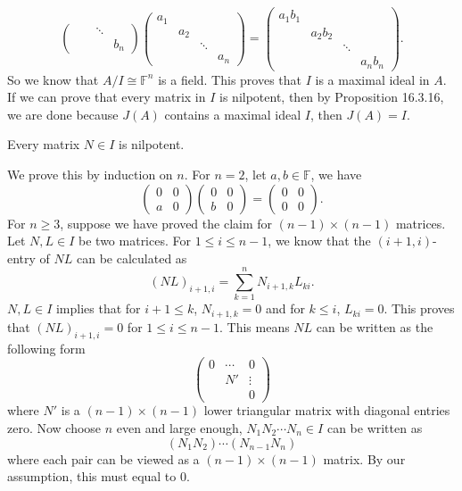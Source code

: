 \documentclass[a4paper, 12pt]{article}
\begin{document}
\begin{solution}
\[\begin{pmatrix}
    & & \ddots &  \\ 
    & & & b_n
\end{pmatrix}\begin{pmatrix}
    a_1& & &  \\ 
    &a_2& &  \\ 
    & & \ddots &  \\ 
    & & & a_n
\end{pmatrix}=\begin{pmatrix}
    a_1b_1& & &  \\ 
    &a_2b_2& &  \\ 
    & & \ddots &  \\ 
    & & & a_nb_n
\end{pmatrix}.\]
So we know that \(A/I\cong \mathbb{F}^n\) is a field. This proves that \(I\) is a maximal ideal in \(A\). If we can prove that every matrix in \(I\) is nilpotent, then by Proposition 16.3.16, we are done because \(J(A)\) contains a maximal ideal \(I\), then \(J(A)=I\). 
\begin{claim}
Every matrix \(N\in I\) is nilpotent. 
\end{claim}
\begin{claimproof}
We prove this by induction on \(n\). For \(n=2\), let \(a,b\in \mathbb{F}\), we have 
\[\begin{pmatrix}
    0&0\\ 
    a&0
\end{pmatrix}\begin{pmatrix}
    0&0\\ 
    b&0
\end{pmatrix}=\begin{pmatrix}
    0&0\\ 
    0&0
\end{pmatrix}.\]
For \(n\geq 3\), suppose we have proved the claim for \((n-1)\times (n-1)\) matrices. Let \(N,L\in I\) be two matrices. For \(1\leq i\leq n-1\), we know that the \((i+1,i)\)-entry of \(NL\) can be calculated as 
\[(NL)_{i+1,i}=\sum_{k=1}^{n}N_{i+1,k}L_{ki}.\]
\(N,L\in I\) implies that for \(i+1\leq k\), \(N_{i+1,k}=0\) and for \(k\leq i\), \(L_{ki}=0\). This proves that \((NL)_{i+1,i}=0\) for \(1\leq i\leq n-1\). This means \(NL\) can be written as the following form 
\[\begin{pmatrix}
    0 &\cdots&0\\ 
    &N'&\vdots\\ 
    & & 0
\end{pmatrix}\]
where \(N'\) is a \((n-1)\times (n-1)\) lower triangular matrix with diagonal entries zero. Now choose \(n\) even and large enough, \(N_1N_2\cdots N_n\in I\) can be written as 
\[(N_1N_2)\cdots (N_{n-1}N_n)\]
where each pair can be viewed as a \((n-1)\times (n-1)\) matrix. By our assumption, this must equal to \(0\).
\end{claimproof}
\end{solution}
\end{document}
